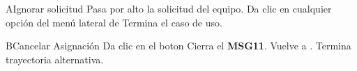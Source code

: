 	\begin{UCtrayectoriaA}{A}{Ignorar solicitud}
		\UCpaso[\UCactor] Pasa por alto la solicitud del equipo.
		\UCpaso[\UCactor] Da clic en cualquier opción del menú lateral de 
		\UCpaso Termina el caso de uso.
	\end{UCtrayectoriaA}

	\begin{UCtrayectoriaA}{B}{Cancelar Asignación}
		\UCpaso[\UCactor] Da clic en el boton 
		\UCpaso Cierra el {\bf MSG11}.
		\UCpaso Vuelve a . 
		\UCpaso Termina trayectoria alternativa.
	\end{UCtrayectoriaA}
	

